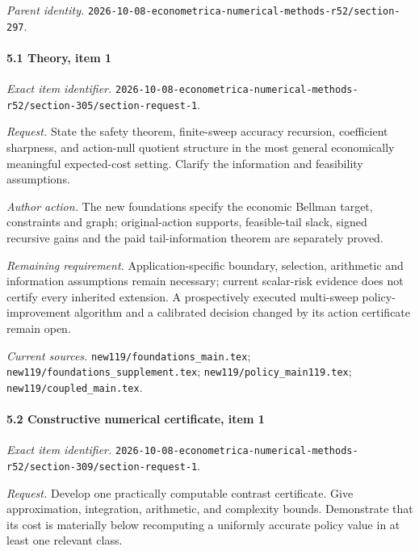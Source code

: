 \par\emph{Parent identity.} \nolinkurl{2026-10-08-econometrica-numerical-methods-r52/section-297}.

\paragraph{5.1 Theory, item 1}

\emph{Exact item identifier.} \nolinkurl{2026-10-08-econometrica-numerical-methods-r52/section-305/section-request-1}.

\par\emph{Request.} State the safety theorem, finite-sweep accuracy recursion, coefficient sharpness, and action-null quotient structure in the most general economically meaningful expected-cost setting. Clarify the information and feasibility assumptions.

\par\emph{Author action.} The new foundations specify the economic Bellman target, constraints and graph; original-action supports, feasible-tail slack, signed recursive gains and the paid tail-information theorem are separately proved.

\par\emph{Remaining requirement.} Application-specific boundary, selection, arithmetic and information assumptions remain necessary; current scalar-risk evidence does not certify every inherited extension. A prospectively executed multi-sweep policy-improvement algorithm and a calibrated decision changed by its action certificate remain open.

\par\emph{Current sources.} \nolinkurl{new119/foundations_main.tex}; \nolinkurl{new119/foundations_supplement.tex}; \nolinkurl{new119/policy_main119.tex}; \nolinkurl{new119/coupled_main.tex}.

\paragraph{5.2 Constructive numerical certificate, item 1}

\emph{Exact item identifier.} \nolinkurl{2026-10-08-econometrica-numerical-methods-r52/section-309/section-request-1}.

\par\emph{Request.} Develop one practically computable contrast certificate. Give approximation, integration, arithmetic, and complexity bounds. Demonstrate that its cost is materially below recomputing a uniformly accurate policy value in at least one relevant class.

